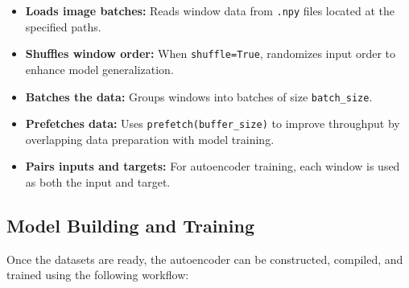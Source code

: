 \documentclass[11pt]{article}
\begin{document}
\begin{itemize}
  \item \textbf{Loads image batches:} Reads window data from \texttt{.npy} files located at the specified paths.
  \item \textbf{Shuffles window order:} When \texttt{shuffle=True}, randomizes input order to enhance model generalization.
  \item \textbf{Batches the data:} Groups windows into batches of size \texttt{batch\_size}.
  \item \textbf{Prefetches data:} Uses \texttt{prefetch(buffer\_size)} to improve throughput by overlapping data preparation with model training.
  \item \textbf{Pairs inputs and targets:} For autoencoder training, each window is used as both the input and target.
\end{itemize}

\subsection*{Model Building and Training}

Once the datasets are ready, the autoencoder can be constructed, compiled, and trained using the following workflow:
\end{document}
